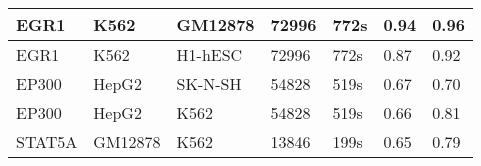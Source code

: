 \documentclass{article}
\begin{document}
\begin{table}[b]
\begin{tabular}{|l|l|l|l|l|l|l|}
EGR1               & K562                        & GM12878                        & 72996   & 772s        & 0.94                     & 0.96 \\ \hline
EGR1               & K562                        & H1-hESC                        & 72996   & 772s       & 0.87                     & 0.92  \\ \hline
EP300              & HepG2                       & SK-N-SH                         & 54828   & 519s       & 0.67                     & 0.70  \\ \hline
EP300              & HepG2                       & K562                            & 54828   & 519s       & 0.66                     & 0.81 \\ \hline
STAT5A             & GM12878                     & K562                             & 13846   & 199s      & 0.65                     & 0.79  \\ \hline

\end{tabular}
\label{table:deepbind}
\end{table}
\end{document}
